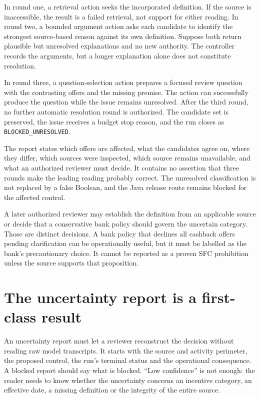 In round one, a retrieval action seeks the incorporated definition. If the source
is inaccessible, the result is a failed retrieval, not support for either
reading. In round two, a bounded argument action asks each candidate to identify
the strongest source-based reason against its own definition. Suppose both
return plausible but unresolved explanations and no new authority. The controller
records the arguments, but a longer explanation alone does not constitute
resolution.

In round three, a question-selection action prepares a focused review question
with the contrasting offers and the missing premise. The action can successfully
produce the question while the issue remains unresolved. After the third round,
no further automatic resolution round is authorized. The candidate set is
preserved, the issue receives a budget stop reason, and the run closes as
\texttt{BLOCKED\_UNRESOLVED}.

The report states which offers are affected, what the candidates agree on, where
they differ, which sources were inspected, which source remains unavailable, and
what an authorized reviewer must decide. It contains no assertion that three
rounds make the leading reading probably correct. The unresolved classification
is not replaced by a false Boolean, and the Java release route remains blocked
for the affected control.

A later authorized reviewer may establish the definition from an applicable
source or decide that a conservative bank policy should govern the uncertain
category. Those are distinct decisions. A bank policy that declines all cashback
offers pending clarification can be operationally useful, but it must be labelled
as the bank's precautionary choice. It cannot be reported as a proven SFC
prohibition unless the source supports that proposition.

\section{The uncertainty report is a first-class result}

An uncertainty report must let a reviewer reconstruct the decision without
reading raw model transcripts. It starts with the source and activity perimeter,
the proposed control, the run's terminal status and the operational consequence.
A blocked report should say what is blocked. ``Low confidence'' is not enough:
the reader needs to know whether the uncertainty concerns an incentive category,
an effective date, a missing definition or the integrity of the entire source.

